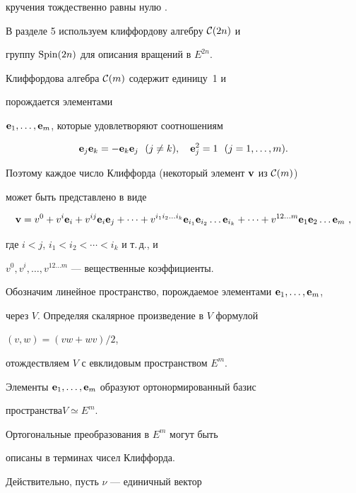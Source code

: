 кручения тождественно равны нулю \cite{Mo}.





В разделе 5 используем клиффордову алгебру ${\cal C}(2n)$ и


группу $\operatorname{Spin}(2n)$ для описания вращений в $E^{2n}$.


Клиффордова алгебра ${\cal C}(m)$ содержит единицу~1 и


порождается элементами


$\bold e_1,\dotsc,\bold e_{m}$, которые удовлетворяют соотношениям


$$


\e_j \e_k = - \e_k \e_j \ \ (j\neq k), \quad 


\e_j^2 = 1 \ \ (j=1,\dotsc,m).


$$


Поэтому каждое число Клиффорда (некоторый элемент $\bold v$ из ${\cal C}(m)$)


может быть представлено в виде


$$


\bold v=v^0 + v^i \e_i + v^{ij} \e_i \e_j + \dotsb +


v^{i_1i_2\dotsc i_k} \e_{i_1} \e_{i_2} \dotsc \e_{i_k} + \dotsb


+ v^{12\dotsc m} \e_1\e_2\dotsc\e_{m} \ ,


$$


где $i < j$, $i_1 < i_2 < \dotsb < i_k$ и т.\,д., и


$v^0,v^i, \dotsc, v^{12\dotsc m}$ --- вещественные коэффициенты.





Обозначим линейное пространство, порождаемое элементами $\bold e_1,\dotsc,\bold e_{m}$,


через $V$. Определяя скалярное произведение в $V$ формулой


$(v,w)=(vw + wv)/2$,


отождествляем $V$ с евклидовым пространством $E^{m}$. 


Элементы $\bold e_1, \dotsc, \bold e_{m}$ образуют ортонормированный базис


пространства\linebreak $V \simeq E^m$.





Ортогональные преобразования в $E^m$ могут быть


описаны в терминах чисел Клиффорда.


Действительно, пусть $\nu$ --- единичный вектор


